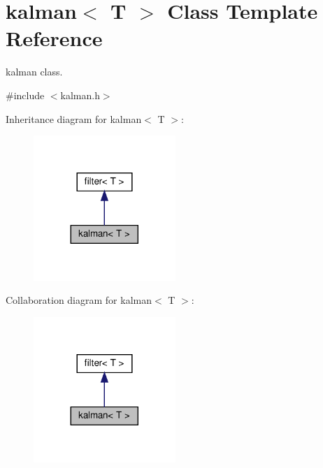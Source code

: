 \hypertarget{classkalman}{}\section{kalman$<$ T $>$ Class Template Reference}
\label{classkalman}


kalman class.  




{\ttfamily \#include $<$kalman.\+h$>$}



Inheritance diagram for kalman$<$ T $>$\+:\nopagebreak
\begin{figure}[H]
\begin{center}
\leavevmode
\includegraphics[width=152pt]{classkalman__inherit__graph}
\end{center}
\end{figure}


Collaboration diagram for kalman$<$ T $>$\+:\nopagebreak
\begin{figure}[H]
\begin{center}
\leavevmode
\includegraphics[width=152pt]{classkalman__coll__graph}
\end{center}
\end{figure}
